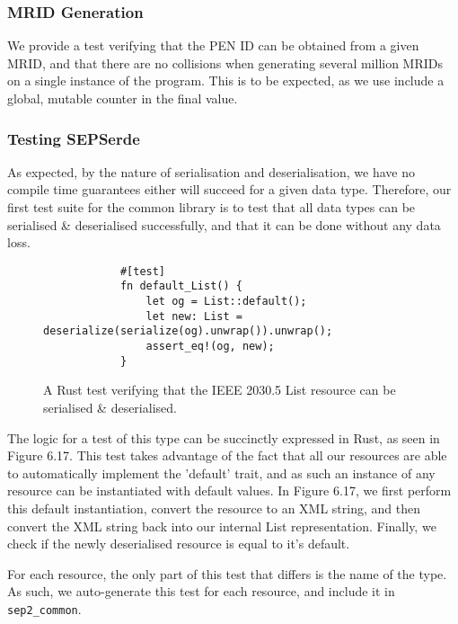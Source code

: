 \subsubsection{MRID Generation}
We provide a test verifying that the PEN ID can be obtained from a given MRID, and that there are no collisions when generating several million MRIDs on a single instance of the program. This is to be expected, as we use include a global, mutable counter in the final value.

\subsubsection{Testing SEPSerde}
As expected, by the nature of serialisation and deserialisation, we have no compile time guarantees either will succeed for a given data type.
Therefore, our first test suite for the common library is to test that all data types can be serialised \& deserialised successfully, and that it can be done without any data loss.

\begin{figure}[h]
    \begin{center}
        \begin{lstlisting}
            #[test]
            fn default_List() {
                let og = List::default();
                let new: List = deserialize(serialize(og).unwrap()).unwrap();
                assert_eq!(og, new);
            }
        \end{lstlisting}
        \label{fig:yaserdetest}
        \vspace{-10pt}
        \caption{A Rust test verifying that the IEEE 2030.5 List resource can be serialised \& deserialised.}
    \end{center}
\end{figure}

The logic for a test of this type can be succinctly expressed in Rust, as seen in Figure 6.17. 
This test takes advantage of the fact that all our resources are able to automatically implement the 'default' trait, and as such an instance of any resource can be instantiated with default values.
In Figure 6.17, we first perform this default instantiation, convert the resource to an XML string, and then convert the XML string back into our internal List representation. 
Finally, we check if the newly deserialised resource is equal to it's default.

For each resource, the only part of this test that differs is the name of the type. As such, we auto-generate this test for each resource, and include it in \texttt{sep2\_common}.

